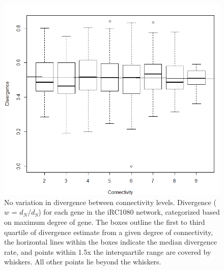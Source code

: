 \documentclass[letterpaper, 10 pt, conference]{ieeeconf}  %
\begin{document}
 \begin{figure}[thpb]
      \centering


      \includegraphics[scale=0.44]{final__divergence_connectivity.png}
      \caption{\fontsize{8}{11}\selectfont No variation in divergence between connectivity levels. Divergence ($w$ = $d_N/d_S$) for each gene in the iRC1080 network, categorized based on maximum degree of gene. The boxes outline the first to third quartile of divergence estimate from a given degree of connectivity, the horizontal lines within the boxes indicate the median divergence rate, and points within 1.5x the interquartile range are covered by whiskers. All other points lie beyond the whiskers. }
   \end{figure}
   

   

\subsection*{}
\end{document}
